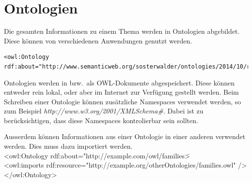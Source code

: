 % 
% 
% 

\section{Ontologien}
\label{sec:owl_owl_Ontologien}

Die gesamten Informationen zu einem Thema werden in Ontologien abgebildet. Diese können von verschiedenen Anwendungen genutzt werden.

\begin{lstlisting}[caption={Beispiel einer Definition einer Ontologie}]
    <owl:Ontology rdf:about="http://www.semanticweb.org/sosterwalder/ontologies/2014/10/reiseplaner"/>
\end{lstlisting}

Ontologien werden in bzw.\ als OWL-Dokumente abgespeichert. Diese können entweder rein lokal, oder aber im Internet zur Verfügung gestellt werden.
Beim Schreiben einer Ontologie können zusätzliche Namespaces verwendet werden, so zum Beispiel \textit{http://www.w3.org/2001/XMLSchema\#}. Dabei ist zu berücksichtigen, dass diese Namespaces kontrolierbar sein sollten. %

Ausserdem können Informationen aus einer Ontologie in einer anderen verwendet werden. Dies muss dazu importiert werden.\\
 \noindent\hspace*{15mm}<owl:Ontology rdf:about="http://example.com/owl/families\">\\
 \noindent\hspace*{25mm}  <owl:imports rdf:resource="http://example.org/otherOntologies/families.owl" />\\
 \noindent\hspace*{15mm}</owl:Ontology>\\

